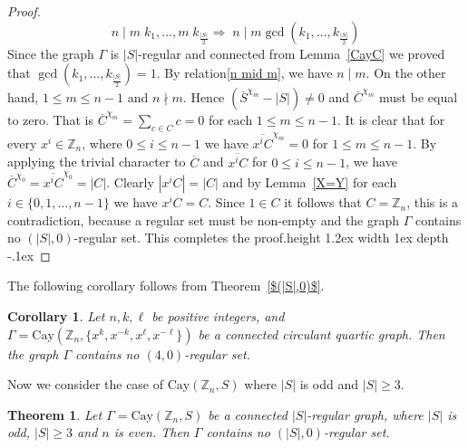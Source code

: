 \documentclass[12pt]{article}
\def\bull{\vrule height 1.2ex width 1ex depth -.1ex }
\newtheorem{cor}[formula]{Corollary}
\newtheorem{thm}[formula]{Theorem}
\begin{document}
\begin{proof}
\begin{equation}
	 n \mid m\;k_1, \ldots, m\;k_{\frac{|S|}{2}} \Longrightarrow\; n \mid m  \gcd(k_1,\dots, k_{\frac{|S|}{2}})
	\end{equation}
	Since the graph $\Gamma$ is $|S|$-regular and connected from Lemma~\ref{CayC} we proved that $\gcd(k_1,\ldots,k_{\frac{|S|}{2}})=1$. By relation\eqref{n mid m}, we have $n \mid m$. On the other hand, $1 \le m \le n-1$ and $n \nmid m$. Hence $(\overline{S}^{\chi_m}-|S|) \neq 0$ and $\overline{C}^{\chi_m}$ must be equal to zero. That is $\overline{C}^{\chi_m} = \sum\limits_{c \in C} c =0 $ for each $1 \le m \le n-1$. It is clear that for every $x^i \in \mathbb{Z}_n$, where $ 0 \le i \le n-1$ we have $\overline{x^i C}^{\chi_m} = 0$ for $1 \le m \le n-1 $. By applying the trivial character to $\overline{ C}$ and $\overline{x^i C}$ for $0 \le i \le n-1 $, we have $\overline{C}^{\chi_0} = \overline{x^i C}^{\chi_0} = |C|$. Clearly $|x^i C| = |C|$ and by Lemma~\ref{X=Y} for each $i \in \{0,1,\ldots,n-1\}$ we have $x^i C = C$. Since $1 \in C$ it follows that $C = \mathbb{Z}_n $, this is a contradiction, because a regular set must be non-empty and the graph $\Gamma$ contains no $(|S|,0)$-regular set. This completes the proof.\hfill\bull
		\end{proof}
		The following corollary follows from Theorem~\ref{$(|S|,0)$}.
	\begin{cor}\label{$(4,0)$-regular set}
		Let $n, k, \ell$ be positive integers, and  $\Gamma = \mathrm{Cay}(\mathbb{Z}_n, \{x^k, x^{-k}, x^\ell, x^{-\ell}\})$ be a connected circulant quartic graph. Then the graph $\Gamma$ contains no $(4,0)$-regular set. 		
	\end{cor}
	Now we consider the case of $\mathrm{Cay}(\mathbb{Z}_n, S)$ where $|S|$ is odd and $|S|\geq3$.
	\begin{thm}\label{$(|S|,0)Sodd$}
	Let $\Gamma = \mathrm{Cay}(\mathbb{Z}_n, S)$ be a connected $|S|$-regular graph, where $|S|$ is odd, $|S|\geq3 $ and $n$ is even. Then $\Gamma$ contains no $(|S|, 0)$-regular set.
      \end{thm}	
\end{document}
